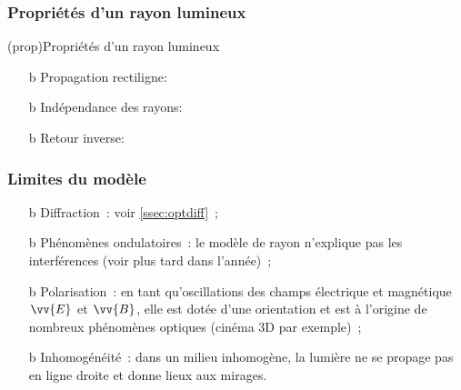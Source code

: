 \documentclass[../../main/main.tex]{subfiles}
\begin{document}
\subsubsection{Propriétés d'un rayon lumineux}

\begin{tcb*}[label=prop:rl](prop){Propriétés d'un rayon lumineux}
  \begin{enumerate}
    \item[b]{Propagation rectiligne}: %
    \item[b]{Indépendance des rayons}: %
    \item[b]{Retour inverse}: %
    \begin{center}
      \captionsetup{justification=centering}
    \end{center}
  \end{enumerate}
\end{tcb*}

\subsubsection{Limites du modèle}

\begin{itemize}[label=$\diamond$, leftmargin=10pt]
	\item[b]{Diffraction}~: voir \ref{ssec:optdiff}~;
	\item[b]{Phénomènes ondulatoires}~: le modèle de rayon n'explique pas les
	interférences (voir plus tard dans l'année)~;
	\item[b]{Polarisation}~: en tant qu'oscillations des champs électrique et
	magnétique $\vv{E}$ et $\vv{B}$, elle est dotée d'une orientation et est à
	l'origine de nombreux phénomènes optiques (cinéma 3D par exemple)~;
	\item[b]{Inhomogénéité}~: dans un milieu inhomogène, la lumière ne se propage
	pas en ligne droite et donne lieux aux mirages.
\end{itemize}
\end{document}
